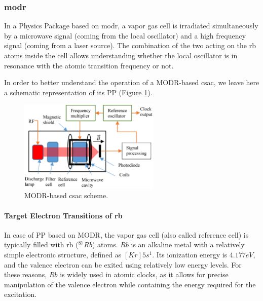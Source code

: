 \subsubsection{\acrfull{modr}}
\label{sssec:MODR}

In a Physics Package based on \acrfull{modr}, a vapor gas cell is irradiated simultaneously by a microwave signal (coming from the local oscillator) and a high frequency signal (coming from a laser source).
The combination of the two acting on the \acrfull{rb} atoms inside the cell allows understanding whether the local oscillator is in resonance with the atomic transition frequency or not.

In order to better understand the operation of a MODR-based \acrshort{csac}, we leave here a schematic representation of its PP (Figure \ref{fig:MODR-physics-package-scheme}).

\begin{figure}[H]
    \centering
    \includegraphics[width=0.6\textwidth, max width=\linewidth]{img/MODR-phisics-package-scheme.png}
    \caption{
        MODR-based \acrshort{csac} scheme.
    }
    \label{fig:MODR-physics-package-scheme}
\end{figure}

\paragraph{Target Electron Transitions of \acrfull{rb}}

In case of PP based on MODR, the vapor gas cell (also called reference cell) is typically filled with \acrfull{rb} ($^{87}Rb$) atoms.
$Rb$ is an alkaline metal with a relatively simple electronic structure, defined as $[Kr]5s^1$.
Its ionization energy is $4.177 eV$, and the valence electron can be exited using relatively low energy levels.
For these reasons, $Rb$ is widely used in atomic clocks, as it allows for precise manipulation of the valence electron while containing the energy required for the excitation.

